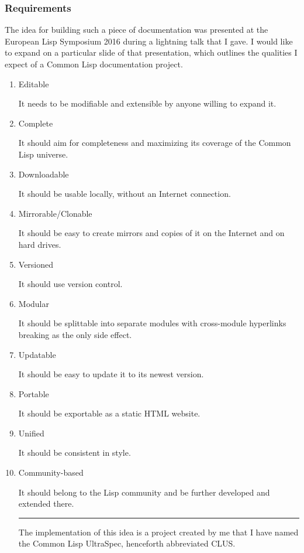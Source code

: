 \subsubsection{Requirements}\label{requirements}

The idea for building such a piece of documentation was presented at the
European Lisp Symposium 2016 during a lightning talk that I gave. I
would like to expand on a particular slide of that presentation, which
outlines the qualities I expect of a Common Lisp documentation project.

\begin{enumerate}
\item
  Editable

  It needs to be modifiable and extensible by anyone willing to expand
  it.
\item
  Complete

  It should aim for completeness and maximizing its coverage of the
  Common Lisp universe.
\item
  Downloadable

  It should be usable locally, without an Internet connection.
\item
  Mirrorable/Clonable

  It should be easy to create mirrors and copies of it on the Internet
  and on hard drives.
\item
  Versioned

  It should use version control.
\item
  Modular

  It should be splittable into separate modules with cross-module
  hyperlinks breaking as the only side effect.
\item
  Updatable

  It should be easy to update it to its newest version.
\item
  Portable

  It should be exportable as a static HTML website.
\item
  Unified

  It should be consistent in style.
\item
  Community-based

  It should belong to the Lisp community and be further developed and
  extended there.

  \begin{center}\rule{0.5\linewidth}{\linethickness}\end{center}

  The implementation of this idea is a project created by me that I have
  named the Common Lisp UltraSpec, henceforth abbreviated CLUS.


\end{enumerate}
